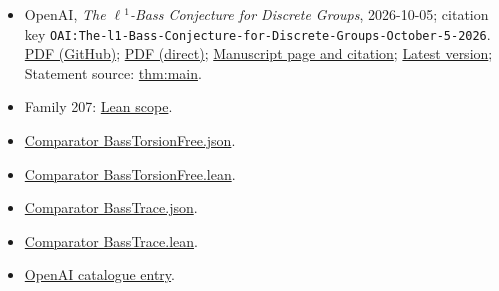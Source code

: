 \documentclass[11pt]{article}
\begin{document}
\begin{itemize}
\item OpenAI, \emph{The \(\ell\)\({}^{1}\)-Bass Conjecture for Discrete Groups}, 2026-10-05; citation key \texttt{OAI:The-l1-Bass-Conjecture-for-Discrete-Groups-October-5-2026}. \href{https://github.com/openai/math/blob/adc7f1241b42e322a6451854ab7e4b4c146bf78a/preprints/The-l1-Bass-Conjecture-for-Discrete-Groups-October-5-2026/l1-bass-conjecture.pdf}{PDF (GitHub)}; \href{https://github.com/openai/math/raw/adc7f1241b42e322a6451854ab7e4b4c146bf78a/preprints/The-l1-Bass-Conjecture-for-Discrete-Groups-October-5-2026/l1-bass-conjecture.pdf}{PDF (direct)}; \href{https://github.com/openai/math/blob/adc7f1241b42e322a6451854ab7e4b4c146bf78a/preprints/The-l1-Bass-Conjecture-for-Discrete-Groups-October-5-2026/README.md}{Manuscript page and citation}; \href{https://github.com/openai/math/blob/main/preprints/The-l1-Bass-Conjecture-for-Discrete-Groups-October-5-2026/l1-bass-conjecture.pdf}{Latest version}; Statement source: \href{https://github.com/openai/math/blob/adc7f1241b42e322a6451854ab7e4b4c146bf78a/preprints/The-l1-Bass-Conjecture-for-Discrete-Groups-October-5-2026/build/sections/01-introduction.tex\#L35}{thm:main}.
\item Family 207: \href{https://github.com/openai/math/blob/adc7f1241b42e322a6451854ab7e4b4c146bf78a/lean/docs/207.md}{Lean scope}.
\item \href{https://github.com/openai/math/blob/adc7f1241b42e322a6451854ab7e4b4c146bf78a/lean/ComparatorChallenges/BassTorsionFree.json}{Comparator BassTorsionFree.json}.
\item \href{https://github.com/openai/math/blob/adc7f1241b42e322a6451854ab7e4b4c146bf78a/lean/ComparatorChallenges/BassTorsionFree.lean}{Comparator BassTorsionFree.lean}.
\item \href{https://github.com/openai/math/blob/adc7f1241b42e322a6451854ab7e4b4c146bf78a/lean/ComparatorChallenges/BassTrace.json}{Comparator BassTrace.json}.
\item \href{https://github.com/openai/math/blob/adc7f1241b42e322a6451854ab7e4b4c146bf78a/lean/ComparatorChallenges/BassTrace.lean}{Comparator BassTrace.lean}.
\item \href{https://github.com/openai/math/blob/adc7f1241b42e322a6451854ab7e4b4c146bf78a/CONTENTS.md}{OpenAI catalogue entry}.
\end{itemize}
\end{document}

